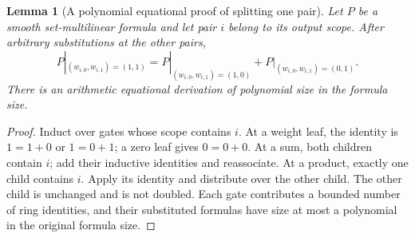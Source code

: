 \documentclass[11pt]{article}
\newtheorem{lemma}[theorem]{Lemma}
\theoremstyle{definition}
\theoremstyle{remark}
\begin{document}
\begin{lemma}[A polynomial equational proof of splitting one pair]
\label{lem:pair-shannon}
Let $P$ be a smooth set-multilinear formula and let pair $i$ belong
to its output scope. After arbitrary substitutions at the other
pairs,
\[
 P|_{(w_{i,0},w_{i,1})=(1,1)}
 =P|_{(w_{i,0},w_{i,1})=(1,0)}
  +P|_{(w_{i,0},w_{i,1})=(0,1)}.
 \tag{\thesection.12}\label{eq:pair-shannon}
\]
There is an arithmetic equational derivation of polynomial size in
the formula size.
\end{lemma}
\begin{proof}
Induct over gates whose scope contains $i$. At a weight leaf, the
identity is $1=1+0$ or $1=0+1$; a zero leaf gives $0=0+0$.
At a sum, both children contain $i$; add their inductive identities
and reassociate. At a product, exactly one child contains $i$.
Apply its identity and distribute over the other child. The other
child is unchanged and is not doubled. Each gate contributes a
bounded number of ring identities, and their substituted formulas
have size at most a polynomial in the original formula size.
\end{proof}
\end{document}
